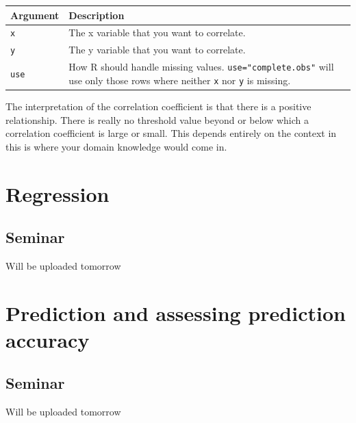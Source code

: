 \documentclass[]{article}
\begin{document}
\begin{longtable}[]{@{}ll@{}}
\toprule
\begin{minipage}[b]{0.11\columnwidth}\raggedright
Argument\strut
\end{minipage} & \begin{minipage}[b]{0.83\columnwidth}\raggedright
Description\strut
\end{minipage}\tabularnewline
\midrule
\endhead
\begin{minipage}[t]{0.11\columnwidth}\raggedright
\texttt{x}\strut
\end{minipage} & \begin{minipage}[t]{0.83\columnwidth}\raggedright
The x variable that you want to correlate.\strut
\end{minipage}\tabularnewline
\begin{minipage}[t]{0.11\columnwidth}\raggedright
\texttt{y}\strut
\end{minipage} & \begin{minipage}[t]{0.83\columnwidth}\raggedright
The y variable that you want to correlate.\strut
\end{minipage}\tabularnewline
\begin{minipage}[t]{0.11\columnwidth}\raggedright
\texttt{use}\strut
\end{minipage} & \begin{minipage}[t]{0.83\columnwidth}\raggedright
How R should handle missing values. \texttt{use="complete.obs"} will use only those rows where neither \texttt{x} nor \texttt{y} is missing.\strut
\end{minipage}\tabularnewline
\bottomrule
\end{longtable}

The interpretation of the correlation coefficient is that there is a positive relationship. There is really no threshold value beyond or below which a correlation coefficient is large or small. This depends entirely on the context in this is where your domain knowledge would come in.

\hypertarget{regression}{%
\section{Regression}\label{regression}}

\hypertarget{seminar-7}{%
\subsection{Seminar}\label{seminar-7}}

Will be uploaded tomorrow

\hypertarget{prediction-and-assessing-prediction-accuracy}{%
\section{Prediction and assessing prediction accuracy}\label{prediction-and-assessing-prediction-accuracy}}

\hypertarget{seminar-8}{%
\subsection{Seminar}\label{seminar-8}}

Will be uploaded tomorrow
\end{document}
